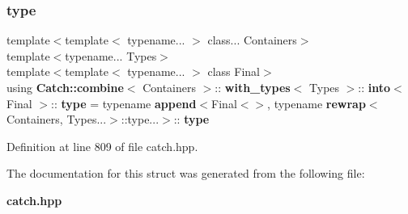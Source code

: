 \subsubsection{type}
{\footnotesize\ttfamily template$<$template$<$ typename... $>$ class... Containers$>$ \\
template$<$typename... Types$>$ \\
template$<$template$<$ typename... $>$ class Final$>$ \\
using \textbf{ Catch\+::combine}$<$ Containers $>$\+::\textbf{ with\+\_\+types}$<$ Types $>$\+::\textbf{ into}$<$ Final $>$\+::\textbf{ type} =  typename \textbf{ append}$<$Final$<$$>$, typename \textbf{ rewrap}$<$Containers, Types...$>$\+::type...$>$\+::\textbf{ type}}



Definition at line 809 of file catch.\+hpp.



The documentation for this struct was generated from the following file\+:\begin{DoxyCompactItemize}
\item 
\textbf{ catch.\+hpp}\end{DoxyCompactItemize}
